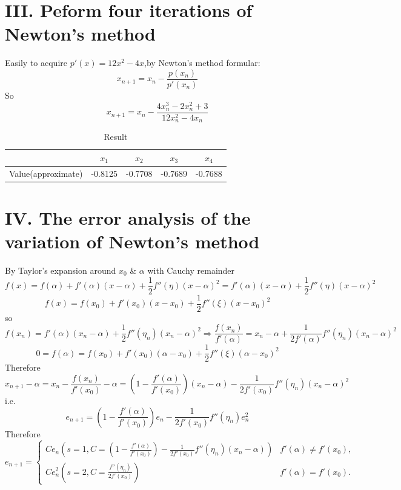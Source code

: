 \documentclass[a4paper]{article}
\begin{document}
\section*{III. Peform four iterations of Newton's method}
Easily to acquire $p'(x) = 12x^2 - 4x$,by Newton's method formular:
\[
x_{n+1} = x_n - \frac{p(x_n)}{p'(x_n)}
\]
So
\[
x_{n+1} = x_n  - \frac{4x_n^3 - 2x_n^2 + 3}{12x_n^2 - 4x_n}
\]
\begin{table}[htbp]
\centering
\caption{Result}
\begin{tabular}{lcccc}
\toprule
 & $x_1$  & $x_2$ & $x_3$ & $x_4$\\
\midrule
Value(approximate) & -0.8125 & -0.7708 & -0.7689 & -0.7688\\
\bottomrule
\end{tabular}
\end{table}

\newpage

\section*{IV. The error analysis of the variation of Newton's method}
By Taylor's expansion around $ x_0$ \& $\alpha$ with Cauchy remainder
\[
f(x) = f(\alpha) + f'(\alpha)(x - \alpha) + \frac{1}{2}f''(\eta )(x - \alpha)^2 = f'(\alpha)(x - \alpha) + \frac{1}{2}f''(\eta )(x - \alpha)^2
\]
\[
f(x) = f(x_0) + f'(x_0)(x - x_0) + \frac{1}{2}f''(\xi)(x - x_0)^2
\]
so
\[
f(x_n) = f'(\alpha)(x_n - \alpha) + \frac{1}{2}f''(\eta_n)(x_n - \alpha)^2 \Rightarrow 
\frac{f(x_n)}{f'(\alpha)} = x_n - \alpha + \frac{1}{2f'(\alpha)}f''(\eta_n)(x_n - \alpha)^2
\]
\[
0 = f(\alpha) = f(x_0) + f'(x_0)(\alpha - x_0) + \frac{1}{2}f''(\xi)(\alpha - x_0)^2 
\]
Therefore
\[
x_{n+1} - \alpha = x_{n} - \frac{f(x_n)}{f'(x_0)} - \alpha = (1 - \frac{f'(\alpha)}{f'(x_0)})(x_n - \alpha) - \frac{1}{2f'(x_0)}f''(\eta_n)(x_n - \alpha)^2
\]
i.e.
\[
e_{n+1} = (1 - \frac{f'(\alpha)}{f'(x_0)})e_n - \frac{1}{2f'(x_0)}f''(\eta_n)e_n^2
\]
Therefore
\[
e_{n+1} =
\begin{cases}
Ce_n(s=1,C = (1 - \frac{f'(\alpha)}{f'(x_0)}) - \frac{1}{2f'(x_0)}f''(\eta_n)(x_n - \alpha)) & f'(\alpha) \neq f'(x_0), \\
Ce_n^2(s=2,C = \frac{f''(\eta_n)}{2f'(x_0)})  & f'(\alpha) = f'(x_0).
\end{cases}
\]
\end{document}
